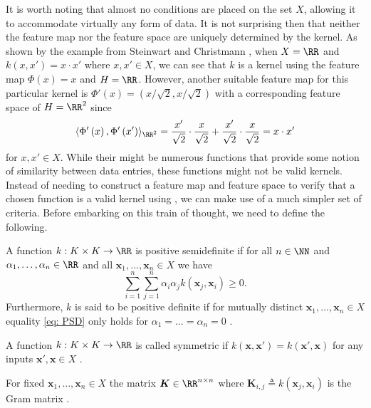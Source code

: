 It is worth noting that almost no conditions are placed on the set $X$, allowing it to accommodate virtually any form of data. It is not surprising then that neither the feature map nor the feature space are uniquely determined by the kernel. As shown by the example from Steinwart and Christmann \cite{SteinwartIngo2008SVMb}, when $X = \RR$ and $k \left( x , x' \right) = x \cdot x'$ where $x , x' \in X$, we can see that $k$ is a kernel using the feature map $\Phi \left( x \right) = x$ and $H = \RR$. However, another suitable feature map for this particular kernel is $\Phi' \left( x \right) = \left( x / \sqrt{2} , x / \sqrt{2} \right)$ with a corresponding feature space of $H = \RR^2$ since
\[
    \langle \Phi' \left( x \right), \Phi' \left( x' \right) \rangle_{\RR^2} = \frac{x'}{\sqrt{2}} \cdot \frac{x}{\sqrt{2}} + \frac{x'}{\sqrt{2}} \cdot \frac{x}{\sqrt{2}} = x \cdot x'
\]
for $x,x' \in X$. While their might be numerous functions that provide some notion of similarity between data entries, these functions might not be valid kernels. Instead of needing to construct a feature map and feature space to verify that a chosen function is a valid kernel using , we can make use of a much simpler set of criteria. Before embarking on this train of thought, we need to define the following.

\begin{defe} \label{defe: PD}
    A function $k : K \times K \to \RR$ is positive semidefinite if for all $n \in \NN$ and $\alpha_1 , \ldots , \alpha_n \in \RR$ and all $\bm{x}_1 ,\ldots , \bm{x}_n \in X$ we have
    \begin{equation}\label{eq: PSD}
        \sum_{i=1}^{n} \sum_{j=1}^{n} \alpha_i \alpha_j k \left( \bm{x}_j , \bm{x}_i \right) \geq 0.
    \end{equation}
    Furthermore, $k$ is said to be positive definite if for mutually distinct $\bm{x}_1 ,\ldots , \bm{x}_n \in X$ equality \ref{eq: PSD} only holds for $\alpha_1 = \ldots = \alpha_n = 0$ \cite{SteinwartIngo2008SVMb}.
\end{defe}

\begin{defe}[Symmetric] \label{defe: Symmetric_function}
    A function $k : K \times K \to \RR$ is called symmetric if $k \left( \bm{x} , \bm{x}' \right) = k \left( \bm{x}' , \bm{x} \right)$ for any inputs $\bm{x}' , \bm{x} \in X$ \cite{SteinwartIngo2008SVMb}.
\end{defe}

\begin{defe} \label{defe: Gram_Matrix}
    For fixed $\bm{x}_1 ,\ldots , \bm{x}_n \in X$ the matrix $\bm{K} \in \RR^{n \times n}$ where $\bm{K}_{i,j} \triangleq k \left( \bm{x}_j , \bm{x}_i \right)$ is the Gram matrix \cite{SteinwartIngo2008SVMb}.
\end{defe}

